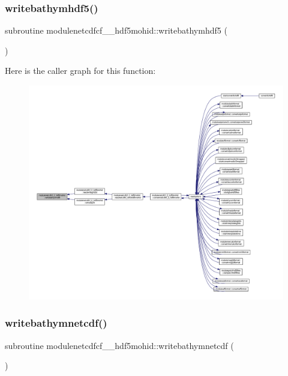 \subsubsection{\texorpdfstring{writebathymhdf5()}{writebathymhdf5()}}
{\footnotesize\ttfamily subroutine modulenetcdfcf\+\_\+\_\+hdf5mohid\+::writebathymhdf5 (\begin{DoxyParamCaption}{ }\end{DoxyParamCaption})\hspace{0.3cm}{\ttfamily [private]}}

Here is the caller graph for this function\+:\nopagebreak
\begin{figure}[H]
\begin{center}
\leavevmode
\includegraphics[width=350pt]{namespacemodulenetcdfcf__2__hdf5mohid_aaf89f5e8bf98ca1365b3c0074c36f8ba_icgraph}
\end{center}
\end{figure}
\mbox{\label{namespacemodulenetcdfcf__2__hdf5mohid_a47fc9c2f9553c656c2bee0e119f10b27}} 
\subsubsection{\texorpdfstring{writebathymnetcdf()}{writebathymnetcdf()}}
{\footnotesize\ttfamily subroutine modulenetcdfcf\+\_\+\_\+hdf5mohid\+::writebathymnetcdf (\begin{DoxyParamCaption}{ }\end{DoxyParamCaption})\hspace{0.3cm}{\ttfamily [private]}}

